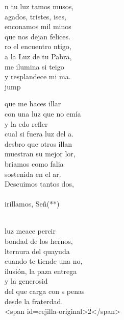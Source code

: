 \begin{cancion}%
	n tu luz tamos musos,\\
	agados, tristes, ises,\\
	enconamos mil minos\\
	que nos dejan felices.\\
	ro el encuentro ntigo,\\
	a la Luz de tu Pabra,\\
	me ilumina si teigo\\
	y resplandece mi ma.\\jump\\
	\begin{chorus}%
	 que  me haces illar \\
	con una luz que no emía\\
	y la edo refler\\
	cual si fuera luz del a. \\
	desbro que otros illan\\
	muestran su mejor lor,\\
	briamos como falia\\
	sostenida en el ar.\\
	Descuimos tantos dos,\\
{}\vspace*{-0.4cm}\\
	irillamos, Señ(**) \\
	\end{chorus}%
	\jump\\
	 luz meace percir\\
	 bondad de los hernos,\\
	lternura del quayuda\\
	cuando te tiende una no,\\
	 ilusión, la paza entrega\\
	y la generosid\\
	del que carga con s penas\\
	desde la fraterdad. \\
<span id=cejilla-original>2</span>\\
\end{cancion}%

